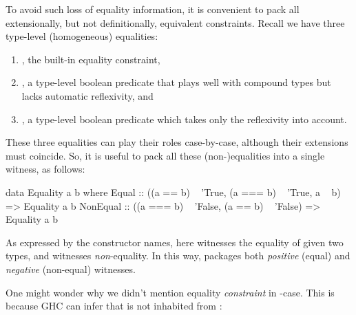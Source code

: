\documentclass[demotion-paper.tex]{subfiles}
\begin{document}
To avoid such loss of equality information, it is convenient to pack all extensionally, but not definitionally, equivalent constraints.
Recall we have three type-level (homogeneous) equalities:
\begin{enumerate}
\item {}, the built-in equality constraint,
\item {}, a type-level boolean predicate that plays well with compound types but lacks automatic reflexivity, and
\item {}, a type-level boolean predicate which takes only the reflexivity into account.
\end{enumerate}
These three equalities can play their roles case-by-case, although their extensions must coincide.
So, it is useful to pack all these (non-)equalities into a single witness, as follows:
\begin{code}
data Equality a b where
  Equal :: ((a == b) ~ 'True, (a === b) ~ 'True,
            a ~ b) => Equality a b
  NonEqual :: ((a === b) ~ 'False, 
              (a == b) ~ 'False) => Equality a b
\end{code}
As expressed by the constructor names, here  witnesses the equality of given two types, and  witnesses \emph{non}-equality.
In this way,  packages both \emph{positive} (equal) and \emph{negative} (non-equal) witnesses.

One might wonder why we didn't mention equality \emph{constraint}  in -case.
This is because GHC can infer that  is not inhabited from :
\end{document}
